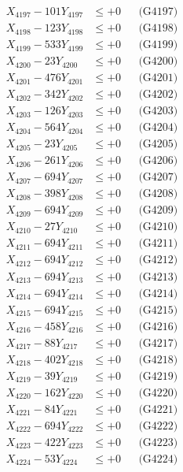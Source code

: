 \documentclass[a4paper,10pt]{article}
\begin{document}
{\begin{align}
X_{4197} - 101Y_{4197} &\leq +0 && \text{(G4197)} \\
X_{4198} - 123Y_{4198} &\leq +0 && \text{(G4198)} \\
X_{4199} - 533Y_{4199} &\leq +0 && \text{(G4199)} \\
X_{4200} - 23Y_{4200} &\leq +0 && \text{(G4200)} \\
\allowbreak
X_{4201} - 476Y_{4201} &\leq +0 && \text{(G4201)} \\
X_{4202} - 342Y_{4202} &\leq +0 && \text{(G4202)} \\
X_{4203} - 126Y_{4203} &\leq +0 && \text{(G4203)} \\
X_{4204} - 564Y_{4204} &\leq +0 && \text{(G4204)} \\
X_{4205} - 23Y_{4205} &\leq +0 && \text{(G4205)} \\
X_{4206} - 261Y_{4206} &\leq +0 && \text{(G4206)} \\
X_{4207} - 694Y_{4207} &\leq +0 && \text{(G4207)} \\
X_{4208} - 398Y_{4208} &\leq +0 && \text{(G4208)} \\
X_{4209} - 694Y_{4209} &\leq +0 && \text{(G4209)} \\
X_{4210} - 27Y_{4210} &\leq +0 && \text{(G4210)} \\
\allowbreak
X_{4211} - 694Y_{4211} &\leq +0 && \text{(G4211)} \\
X_{4212} - 694Y_{4212} &\leq +0 && \text{(G4212)} \\
X_{4213} - 694Y_{4213} &\leq +0 && \text{(G4213)} \\
X_{4214} - 694Y_{4214} &\leq +0 && \text{(G4214)} \\
X_{4215} - 694Y_{4215} &\leq +0 && \text{(G4215)} \\
X_{4216} - 458Y_{4216} &\leq +0 && \text{(G4216)} \\
X_{4217} - 88Y_{4217} &\leq +0 && \text{(G4217)} \\
X_{4218} - 402Y_{4218} &\leq +0 && \text{(G4218)} \\
X_{4219} - 39Y_{4219} &\leq +0 && \text{(G4219)} \\
X_{4220} - 162Y_{4220} &\leq +0 && \text{(G4220)} \\
\allowbreak
X_{4221} - 84Y_{4221} &\leq +0 && \text{(G4221)} \\
X_{4222} - 694Y_{4222} &\leq +0 && \text{(G4222)} \\
X_{4223} - 422Y_{4223} &\leq +0 && \text{(G4223)} \\
X_{4224} - 53Y_{4224} &\leq +0 && \text{(G4224)} \\

\end{align}}
\end{document}
